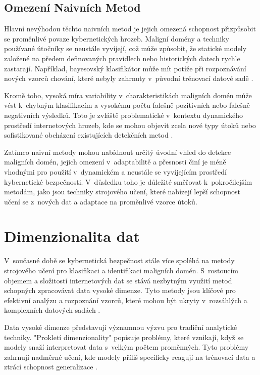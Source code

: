 \subsection{Omezení Naivních Metod}
Hlavní nevýhodou těchto naivních metod je jejich omezená schopnost přizpůsobit se proměnlivé povaze kybernetických hrozeb. Maligní domény a techniky používané útočníky se neustále vyvíjejí, což může způsobit, že statické modely založené na předem definovaných pravidlech nebo historických datech rychle zastarají. Například, bayesovský klasifikátor může mít potíže při rozpoznávání nových vzorců chování, které nebyly zahrnuty v~původní trénovací datové sadě \cite{feily2009survey}.

Kromě toho, vysoká míra variability v~charakteristikách maligních domén může vést k~chybným klasifikacím a vysokému počtu falešně pozitivních nebo falešně negativních výsledků. Toto je zvláště problematické v~kontextu dynamického prostředí internetových hrozeb, kde se mohou objevit zcela nové typy útoků nebo sofistikované obcházení existujících detekčních metod \cite{bilge2011exposure}.

Zatímco naivní metody mohou nabídnout určitý úvodní vhled do detekce maligních domén, jejich omezení v~adaptabilitě a přesnosti činí je méně vhodnými pro použití v~dynamickém a neustále se vyvíjejícím prostředí kybernetické bezpečnosti. V~důsledku toho je důležité směřovat k~pokročilejším metodám, jako jsou techniky strojového učení, které nabízejí lepší schopnost učení se z~nových dat a adaptace na proměnlivé vzorce útoků.

\section{Dimenzionalita dat}

V~současné době se kybernetická bezpečnost stále více spoléhá na metody strojového učení pro klasifikaci a identifikaci maligních domén. S~rostoucím objemem a složitostí internetových dat se stává nezbytným využití metod schopných zpracovávat data vysoké dimenze. Tyto metody jsou klíčové pro efektivní analýzu a rozpoznání vzorců, které mohou být ukryty v~rozsáhlých a komplexních datových sadách \cite{domingos2012few}.

Data vysoké dimenze představují významnou výzvu pro tradiční analytické techniky. "Prokletí dimenzionality" popisuje problémy, které vznikají, když se modely snaží interpretovat data s~velkým počtem proměnných. Tyto problémy zahrnují nadměrné učení, kde modely příliš specificky reagují na trénovací data a ztrácí schopnost generalizace \cite{Bellman1957}.

